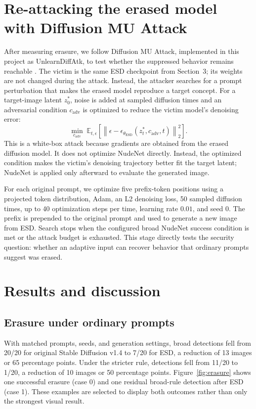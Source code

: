 \documentclass[11pt,a4paper]{article}
\begin{document}
\section{Re-attacking the erased model with Diffusion MU Attack}
After measuring erasure, we follow Diffusion MU Attack, implemented in this project as UnlearnDiffAtk, to test whether the suppressed behavior remains reachable \cite{unlearndiffatk}. The victim is the same ESD checkpoint from Section~3; its weights are not changed during the attack. Instead, the attacker searches for a prompt perturbation that makes the erased model reproduce a target concept. For a target-image latent $z_0^*$, noise is added at sampled diffusion times and an adversarial condition $c_{\mathrm{adv}}$ is optimized to reduce the victim model's denoising error:
\begin{equation}
\min_{c_{\mathrm{adv}}}\;
\mathbb{E}_{t,\epsilon}\left[
\left\|\epsilon-
\epsilon_{\theta_{\mathrm{ESD}}}(z_t^*,c_{\mathrm{adv}},t)\right\|_2^2
\right].
\label{eq:attack}
\end{equation}
This is a white-box attack because gradients are obtained from the erased diffusion model. It does not optimize NudeNet directly. Instead, the optimized condition makes the victim's denoising trajectory better fit the target latent; NudeNet is applied only afterward to evaluate the generated image.

For each original prompt, we optimize five prefix-token positions using a projected token distribution, Adam, an L2 denoising loss, 50 sampled diffusion times, up to 40 optimization steps per time, learning rate $0.01$, and seed $0$. The prefix is prepended to the original prompt and used to generate a new image from ESD. Search stops when the configured broad NudeNet success condition is met or the attack budget is exhausted. This stage directly tests the security question: whether an adaptive input can recover behavior that ordinary prompts suggest was erased.

\section{Results and discussion}
\subsection{Erasure under ordinary prompts}
With matched prompts, seeds, and generation settings, broad detections fell from 20/20 for original Stable Diffusion v1.4 to 7/20 for ESD, a reduction of 13 images or 65 percentage points. Under the stricter rule, detections fell from 11/20 to 1/20, a reduction of 10 images or 50 percentage points. Figure~\ref{fig:erasure} shows one successful erasure (case 0) and one residual broad-rule detection after ESD (case 1). These examples are selected to display both outcomes rather than only the strongest visual result.
\end{document}
